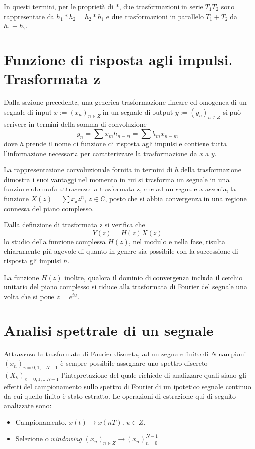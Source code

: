 In questi termini, per le proprietà di $*$, due trasformazioni in serie $T_{1}T_{2}$ sono rappresentate da $h_{1}*h_{2} = h_{2}*h_{1}$ e due trasformazioni in parallelo $T_{1} + T_{2}$ da $h_{1} + h_{2}$.



\section{Funzione di risposta agli impulsi. Trasformata z}
Dalla sezione precedente, una generica trasformazione lineare ed omogenea di un segnale di input $x:=(x_{n})_{n\in Z}$ in un segnale di output
$y:=(y_{n})_{n\in Z}$ si può scrivere in termini della somma di convoluzione
\begin{equation}
 y_{n} = \sum x_{m}h_{n-m} = \sum h_{m}x_{n-m}
\end{equation}
dove $h$ prende il nome di funzione di risposta agli impulsi e contiene tutta l'informazione necessaria per caratterizzare la trasformazione da $x$ a $y$. 

La rappresentazione convoluzionale fornita in termini di $h$ della trasformazione dimostra i suoi vantaggi nel momento in cui si trasforma un segnale in una funzione olomorfa attraverso la trasformata z, che ad un segnale $x$ associa, la funzione $X(z) = \sum x_{n}z^{n}$, $z\in C$, posto che si abbia convergenza in una regione connessa del piano complesso.

Dalla definzione di trasformata z si verifica che
\begin{equation}
 Y(z) = H(z)X(z)
\end{equation}
lo studio della funzione complessa $H(z)$, nel modulo e nella fase, risulta chiaramente più agevole di quanto in genere sia possibile con la successione di risposta gli impulsi $h$.

La funzione $H(z)$ inoltre, qualora il dominio di convergenza includa il cerchio unitario del piano complesso si riduce alla trasformata di Fourier del segnale
una volta che si pone $z = e^{iw}$.



\section{Analisi spettrale di un segnale}

Attraverso la trasformata di Fourier discreta, ad un segnale finito di $N$ campioni $(x_{n})_{n=0,1,...N-1}$ è sempre possibile assegnare uno spettro discreto $(X_{k})_{k=0,1,...N-1}$ l'intepretazione del quale richiede di analizzare quali siano gli effetti del campionamento sullo spettro di Fourier di un ipotetico segnale continuo da cui quello finito è stato estratto. Le operazioni di estrazione qui di seguito analizzate sono:
\begin{itemize}
 \item Campionamento. $x(t)\rightarrow x(nT)$, $n\in Z$.
 \item Selezione o {\it windowing} $(x_{n})_{n\in Z} \rightarrow (x_{n})_{n=0}^{N-1} $
\end{itemize}



